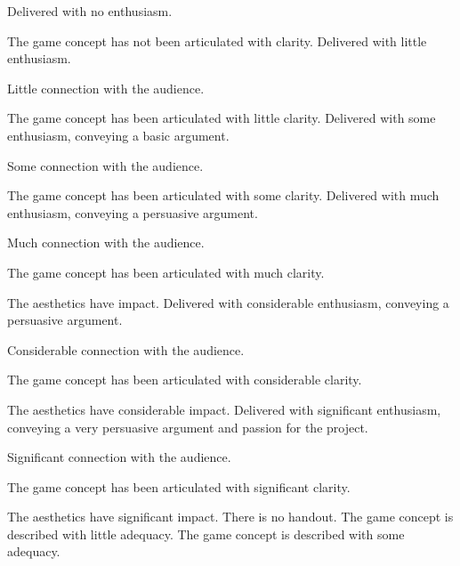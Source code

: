 \documentclass{../../fal_assignment}
\begin{document}
\begin{markingrubric}
%
        \grade\fail Delivered with no enthusiasm. 
           \par The game concept has not been articulated with clarity.
        \grade Delivered with little enthusiasm. 
            \par Little connection with the audience.
            \par The game concept has been articulated with little clarity.
        \grade Delivered with some enthusiasm, conveying a basic argument. 
            \par Some connection with the audience.
            \par The game concept has been articulated with some clarity.
        \grade Delivered with much enthusiasm, conveying a persuasive argument. 
            \par Much connection with the audience.
            \par The game concept has been articulated with much clarity.
            \par The aesthetics have impact.
        \grade Delivered with considerable enthusiasm, conveying a persuasive argument. 
            \par Considerable connection with the audience.
            \par The game concept has been articulated with considerable clarity.
            \par The aesthetics have considerable impact.
        \grade Delivered with significant enthusiasm, conveying a very persuasive argument and passion for the project.
            \par Significant connection with the audience.
            \par The game concept has been articulated with significant clarity.
            \par The aesthetics have significant impact.
%
        \grade\fail There is no handout. 
        \grade The game concept is described with little adequacy.
        \grade The game concept is described with some adequacy.

\end{markingrubric}
\end{document}
